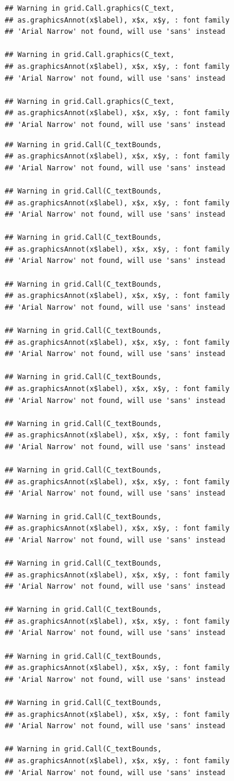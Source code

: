 \documentclass[]{krantz}
\begin{document}
\begin{verbatim}
## Warning in grid.Call.graphics(C_text,
## as.graphicsAnnot(x$label), x$x, x$y, : font family
## 'Arial Narrow' not found, will use 'sans' instead

## Warning in grid.Call.graphics(C_text,
## as.graphicsAnnot(x$label), x$x, x$y, : font family
## 'Arial Narrow' not found, will use 'sans' instead

## Warning in grid.Call.graphics(C_text,
## as.graphicsAnnot(x$label), x$x, x$y, : font family
## 'Arial Narrow' not found, will use 'sans' instead
\end{verbatim}

\begin{verbatim}
## Warning in grid.Call(C_textBounds,
## as.graphicsAnnot(x$label), x$x, x$y, : font family
## 'Arial Narrow' not found, will use 'sans' instead

## Warning in grid.Call(C_textBounds,
## as.graphicsAnnot(x$label), x$x, x$y, : font family
## 'Arial Narrow' not found, will use 'sans' instead

## Warning in grid.Call(C_textBounds,
## as.graphicsAnnot(x$label), x$x, x$y, : font family
## 'Arial Narrow' not found, will use 'sans' instead

## Warning in grid.Call(C_textBounds,
## as.graphicsAnnot(x$label), x$x, x$y, : font family
## 'Arial Narrow' not found, will use 'sans' instead

## Warning in grid.Call(C_textBounds,
## as.graphicsAnnot(x$label), x$x, x$y, : font family
## 'Arial Narrow' not found, will use 'sans' instead

## Warning in grid.Call(C_textBounds,
## as.graphicsAnnot(x$label), x$x, x$y, : font family
## 'Arial Narrow' not found, will use 'sans' instead

## Warning in grid.Call(C_textBounds,
## as.graphicsAnnot(x$label), x$x, x$y, : font family
## 'Arial Narrow' not found, will use 'sans' instead

## Warning in grid.Call(C_textBounds,
## as.graphicsAnnot(x$label), x$x, x$y, : font family
## 'Arial Narrow' not found, will use 'sans' instead

## Warning in grid.Call(C_textBounds,
## as.graphicsAnnot(x$label), x$x, x$y, : font family
## 'Arial Narrow' not found, will use 'sans' instead

## Warning in grid.Call(C_textBounds,
## as.graphicsAnnot(x$label), x$x, x$y, : font family
## 'Arial Narrow' not found, will use 'sans' instead

## Warning in grid.Call(C_textBounds,
## as.graphicsAnnot(x$label), x$x, x$y, : font family
## 'Arial Narrow' not found, will use 'sans' instead

## Warning in grid.Call(C_textBounds,
## as.graphicsAnnot(x$label), x$x, x$y, : font family
## 'Arial Narrow' not found, will use 'sans' instead

## Warning in grid.Call(C_textBounds,
## as.graphicsAnnot(x$label), x$x, x$y, : font family
## 'Arial Narrow' not found, will use 'sans' instead

## Warning in grid.Call(C_textBounds,
## as.graphicsAnnot(x$label), x$x, x$y, : font family
## 'Arial Narrow' not found, will use 'sans' instead
\end{verbatim}
\end{document}
